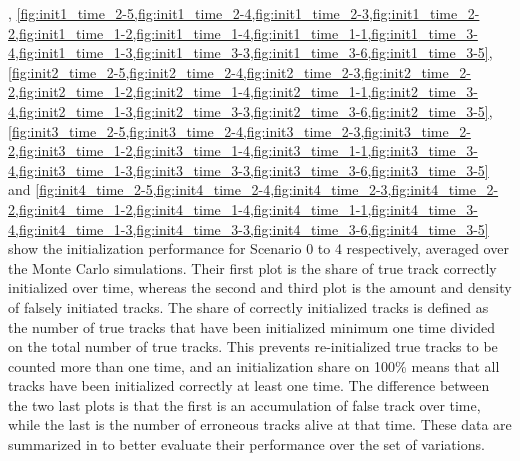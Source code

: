, \cref{fig:init1_time_2-5,fig:init1_time_2-4,fig:init1_time_2-3,fig:init1_time_2-2,fig:init1_time_1-2,fig:init1_time_1-4,fig:init1_time_1-1,fig:init1_time_3-4,fig:init1_time_1-3,fig:init1_time_3-3,fig:init1_time_3-6,fig:init1_time_3-5}, \cref{fig:init2_time_2-5,fig:init2_time_2-4,fig:init2_time_2-3,fig:init2_time_2-2,fig:init2_time_1-2,fig:init2_time_1-4,fig:init2_time_1-1,fig:init2_time_3-4,fig:init2_time_1-3,fig:init2_time_3-3,fig:init2_time_3-6,fig:init2_time_3-5}, \cref{fig:init3_time_2-5,fig:init3_time_2-4,fig:init3_time_2-3,fig:init3_time_2-2,fig:init3_time_1-2,fig:init3_time_1-4,fig:init3_time_1-1,fig:init3_time_3-4,fig:init3_time_1-3,fig:init3_time_3-3,fig:init3_time_3-6,fig:init3_time_3-5} and \cref{fig:init4_time_2-5,fig:init4_time_2-4,fig:init4_time_2-3,fig:init4_time_2-2,fig:init4_time_1-2,fig:init4_time_1-4,fig:init4_time_1-1,fig:init4_time_3-4,fig:init4_time_1-3,fig:init4_time_3-3,fig:init4_time_3-6,fig:init4_time_3-5} show the initialization performance for Scenario 0 to 4 respectively, averaged over the Monte Carlo simulations. Their first plot is the share of true track correctly initialized over time, whereas the second and third plot is the amount and density of falsely initiated tracks. The share of correctly initialized tracks is defined as the number of true tracks that have been initialized minimum one time divided on the total number of true tracks. This prevents re-initialized true tracks to be counted more than one time, and an initialization share on 100\% means that all tracks have been initialized correctly at least one time. The difference between the two last plots is that the first is an accumulation of false track over time, while the last is the number of erroneous tracks alive at that time. These data are summarized in  to better evaluate their performance over the set of variations. 

